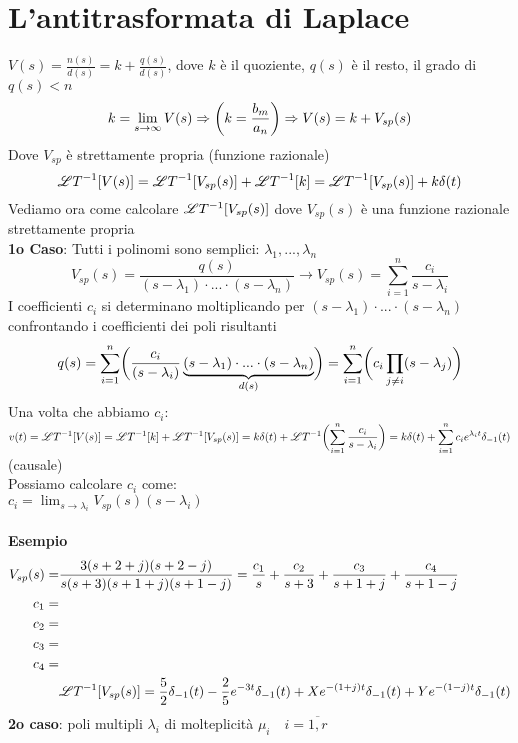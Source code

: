 \section{L'antitrasformata di Laplace}
  $\displaystyle V(s) = \frac{n(s)}{d(s)} = k + \frac{q(s)}{d(s)}$, dove $k$ è il quoziente, $q(s)$ è il resto, il grado di $q(s) < n$\\
  \[
      k = \lim_{s\to\infty}V(s)\Rightarrow\bigg(k = \frac{b_m}{a_n}\bigg)\Rightarrow V(s) = k + V_{sp}(s)
  \]
  Dove $V_{sp}$ è strettamente propria (funzione razionale)
  \[
      \mathscr{L}T^{-1}[V(s)] = \mathscr{L}T^{-1}[V_{sp}(s)] + \mathscr{L}T^{-1}[k] = \mathscr{L}T^{-1}[V_{sp}(s)] + k\delta(t)
  \]
  Vediamo ora come calcolare $\mathscr{L}T^{-1}[V_{sp}(s)]$ dove $V_{sp}(s)$ è una funzione razionale strettamente propria\\
  \textbf{1o Caso}: Tutti i polinomi sono semplici: $\lambda_1, ..., \lambda_n$
  \[
      V_{sp}(s) = \frac{q(s)}{(s - \lambda_1)\cdot...\cdot(s - \lambda_n)} \rightarrow V_{sp}(s) = \sum_{i = 1}^n\frac{c_i}{s - \lambda_i}
  \]
  I coefficienti $c_i$ si determinano moltiplicando per $(s - \lambda_1)\cdot...\cdot(s - \lambda_n)$ confrontando i coefficienti dei poli risultanti
  \[
      q(s) = \sum_{i = 1}^n\BSP{\frac{c_i}{(s - \lambda_i)}\underbrace{(s - \lambda_1)\cdot...\cdot(s - \lambda_n)}_{d(s)}} = \sum_{i = 1}^n\BRP{c_i\prod_{j\ne i}(s - \lambda_j)}
  \]
  Una volta che abbiamo $c_i$:\\ $\displaystyle v(t) = \AL[V(s)] = \AL[k] + \AL[V_{sp}(s)] = k\delta(t) + \AL\BSP{\sum_{i = 1}^n\frac{c_i}{s - \lambda_i}} = k\delta(t) + \sum_{i = 1}^nc_ie^{\lambda_it}\gradino(t)$ (causale)\\
  Possiamo calcolare $c_i$ come:\\ $\displaystyle c_i = \lim_{s\to\lambda_i}V_{sp}(s)(s - \lambda_i)$\\\\
\textbf{Esempio}
\[
   \begin{split}
      V_{sp}(s) = & \frac{3(s + 2 + j) (s + 2 - j)}{s(s + 3)(s + 1 + j)(s + 1 - j)} = \frac{c_1}{s} + \frac{c_2}{s + 3} + \frac{c_3}{s + 1 + j} + \frac{c_4}{s + 1 - j}\\
      c_1 = & \\
      c_2 = & \\
      c_3 = & \\
      c_4 = & \\
      &\mathscr{L}T^{-1}[V_{sp}(s)] = \frac{5}{2}\delta_{-1}(t) - \frac{2}{5}e^{-3t}\delta_{-1}(t) + Xe^{-(1 + j)t}\delta_{-1}(t) + Ye^{-(1 - j)t}\delta_{-1}(t)
   \end{split}
\]
\textbf{2o caso}: poli multipli $\lambda_i$ di molteplicità $\mu_i\quad i = \overline{1,r}$
